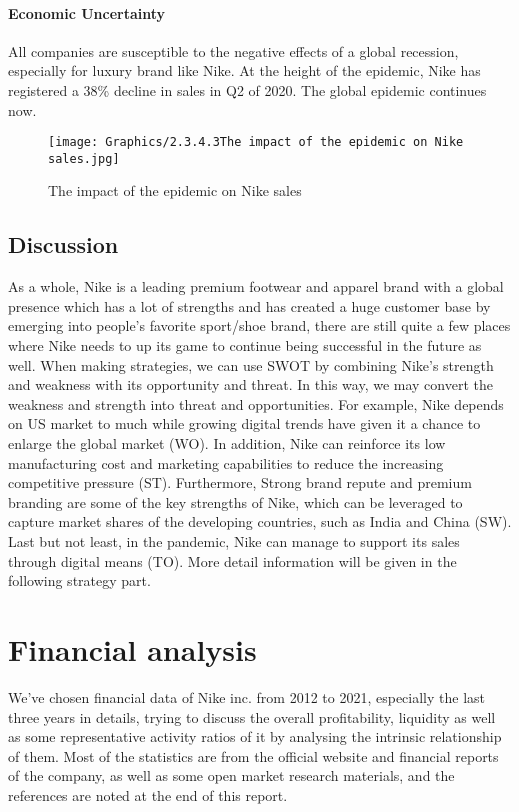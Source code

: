 \documentclass[a4paper, 12pt]{report}
\begin{document}
\paragraph{Economic Uncertainty}
All companies are susceptible to the negative effects of a global recession, especially for luxury brand like Nike. At the height of the epidemic, Nike has registered a 38\% decline in sales in Q2 of 2020. The global epidemic continues now.
 \begin{figure}[ht]
 			\begin{center}
				\texttt{[image: Graphics/2.3.4.3The impact of the epidemic on Nike sales.jpg]}
			\end{center}
       		\caption{\label{2.3.4.3}The impact of the epidemic on Nike sales}
 \end{figure}
\subsection{Discussion} 
As a whole, Nike is a leading premium footwear and apparel brand with a global presence which has a lot of strengths and has created a huge customer base by emerging into people’s favorite sport/shoe brand, there are still quite a few places where Nike needs to up its game to continue being successful in the future as well. When making strategies, we can use SWOT by combining Nike's strength and weakness with its opportunity and threat. In this way, we may convert the weakness and strength into threat and opportunities. For example, Nike depends on US market to much while growing digital trends have given it a chance to enlarge the global market (WO). In addition, Nike can reinforce its low manufacturing cost and marketing capabilities to reduce the increasing competitive pressure (ST). Furthermore, Strong brand repute and premium branding are some of the key strengths of Nike, which can be leveraged to capture market shares of the developing countries, such as India and China (SW). Last but not least, in the pandemic, Nike can manage to support its sales through digital means (TO). More detail information will be given in the following strategy part.

\section{Financial analysis}
We’ve chosen financial data of Nike inc. from 2012 to 2021, especially the last three years in details, trying to discuss the overall profitability, liquidity as well as some representative activity ratios of it by analysing the intrinsic relationship of them. 
Most of the statistics are from the official website and financial reports of the company, as well as some open market research materials, and the references are noted at the end of this report.
\end{document}
